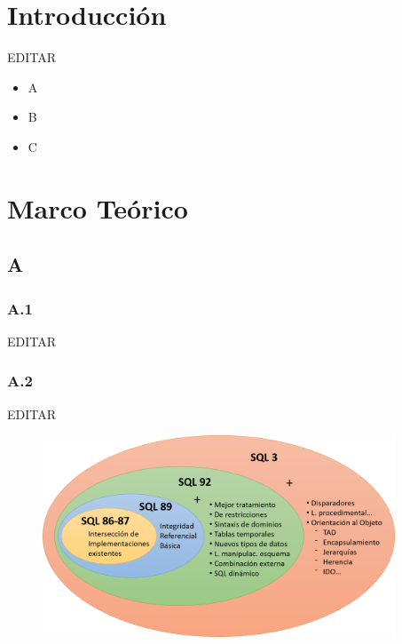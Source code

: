 \documentclass[preprint,12pt]{elsarticle}
\begin{document}

\section{Introducción} 

EDITAR

\begin{itemize}
\item A
\item B
\item C


\end{itemize}




\section{Marco Teórico}


\subsection {\textbf{A}}

\subsubsection{\textbf{A.1}}

EDITAR \cite{SQLne}  %

\subsubsection{\textbf{A.2}}

EDITAR

\begin{figure}[htb]
	\begin{center}
		\includegraphics[width=10.5cm]{./IMAGENES/evolucion} %
	\end{center}
\end{figure}
\end{document}
